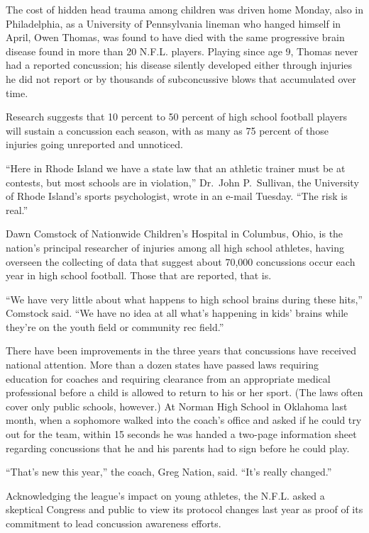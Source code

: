 ﻿\documentclass[12pt]{article}
\begin{document}
The cost of hidden head trauma among children was driven home Monday, also in Philadelphia, as a
University of Pennsylvania lineman who hanged himself in April, Owen Thomas, was found to have died
with the same progressive brain disease found in more than 20 N.F.L. players. Playing since age 9,
Thomas never had a reported concussion; his disease silently developed either through injuries he
did not report or by thousands of subconcussive blows that accumulated over time.

Research suggests that 10 percent to 50 percent of high school football players will sustain a
concussion each season, with as many as 75 percent of those injuries going unreported and unnoticed.

``Here in Rhode Island we have a state law that an athletic trainer must be at contests, but most
schools are in violation,'' Dr.~John P.~Sullivan, the University of Rhode Island's sports
psychologist, wrote in an e-mail Tuesday. ``The risk is real.''

Dawn Comstock of Nationwide Children's Hospital in Columbus, Ohio, is the nation's principal
researcher of injuries among all high school athletes, having overseen the collecting of data that
suggest about 70,000 concussions occur each year in high school football. Those that are reported,
that is.

``We have very little about what happens to high school brains during these hits,'' Comstock said.
``We have no idea at all what's happening in kids' brains while they're on the youth field or
community rec field.''

There have been improvements in the three years that concussions have received national attention.
More than a dozen states have passed laws requiring education for coaches and requiring clearance
from an appropriate medical professional before a child is allowed to return to his or her sport.
(The laws often cover only public schools, however.) At Norman High School in Oklahoma last month,
when a sophomore walked into the coach's office and asked if he could try out for the team, within
15 seconds he was handed a two-page information sheet regarding concussions that he and his parents
had to sign before he could play.

``That's new this year,'' the coach, Greg Nation, said. ``It's really changed.''

Acknowledging the league's impact on young athletes, the N.F.L. asked a skeptical Congress and
public to view its protocol changes last year as proof of its commitment to lead concussion
awareness efforts.
\end{document}
